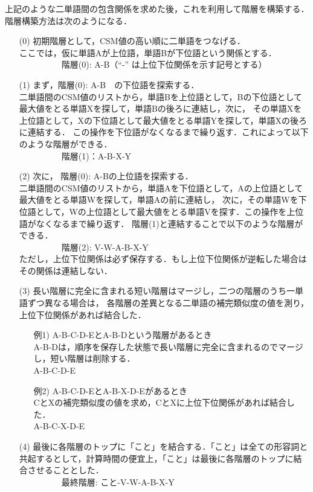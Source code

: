 \documentclass[japanese]{jnlp_1.4}
\begin{document}
上記のような二単語間の包含関係を求めた後，これを利用して階層を構築する．階層構築方法は次のようになる．
\begin{itemize}
\item[(0)]
初期階層として，CSM値の高い順に二単語をつなげる．\\
ここでは，仮に単語Aが上位語，単語Bが下位語という関係とする．\\
　　　　　階層(0): A-B（``-'' は上位下位関係を示す記号とする）
\item[(1)]
まず，階層(0): A-B　の下位語を探索する．\\
二単語間のCSM値のリストから，単語Bを上位語として，Bの下位語として最大値をとる単語Xを探して，単語Bの後ろに連結し，次に，
その単語Xを上位語として，Xの下位語として最大値をとる単語Yを探して，単語Xの後ろに連結する．
この操作を下位語がなくなるまで繰り返す．これによって以下のような階層ができる．\\
　　　　　階層(1)：A-B-X-Y
\item[(2)]
次に，\pagebreak
階層(0): A-Bの上位語を探索する．\\
二単語間のCSM値のリストから，単語Aを下位語として，Aの上位語として最大値をとる単語Wを探して，単語Aの前に連結し，
次に，その単語Wを下位語として，Wの上位語として最大値をとる単語Vを探す．この操作を上位語がなくなるまで繰り返す．
階層(1)と連結することで以下のような階層ができる．\\
　　　　　階層(2): V-W-A-B-X-Y \\
ただし，上位下位関係は必ず保存する．もし上位下位関係が逆転した場合はその関係は連結しない．
\item[(3)]
長い階層に完全に含まれる短い階層はマージし，二つの階層のうち一単語ずつ異なる場合は，
各階層の差異となる二単語の補完類似度の値を測り，上位下位関係があれば結合した．
\begin{itemize}
\item[例1)]
A-B-C-D-EとA-B-Dという階層があるとき \\
A-B-Dは，順序を保存した状態で長い階層に完全に含まれるのでマージし，短い階層は削除する．\\
A-B-C-D-E 
\item[例2)]
A-B-C-D-EとA-B-X-D-Eがあるとき \\
CとXの補完類似度の値を求め，CとXに上位下位関係があれば結合した．\\
A-B-C-X-D-E
\end{itemize}
\item[(4)]
最後に各階層のトップに「こと」を結合する．「こと」は全ての形容詞と共起するとして，計算時間の便宜上，「こと」は最後に各階層のトップに結合させることとした． \\
　　　　　最終階層: こと-V-W-A-B-X-Y 
\end{itemize}
\end{document}
